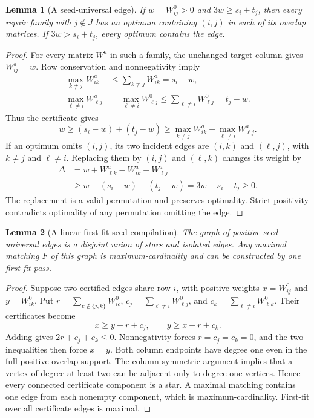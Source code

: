 \documentclass[11pt]{article}
\newtheorem{lemma}{Lemma}
\begin{document}
\begin{lemma}[A seed-universal edge]\label{lem:seed-universal-edge}
If $w=W^0_{ij}>0$ and $3w\ge s_i+t_j$, then every repair family with $j\notin J$ has an optimum containing $(i,j)$ in each of its overlap matrices. If $3w>s_i+t_j$, every optimum contains the edge.
\end{lemma}
\begin{proof}
For every matrix $W^a$ in such a family, the unchanged target column gives $W^a_{ij}=w$. Row conservation and nonnegativity imply
\begin{align}
\max_{k\ne j}W^a_{ik}&\le\sum_{k\ne j}W^a_{ik}=s_i-w,\\
\max_{\ell\ne i}W^a_{\ell j}&=\max_{\ell\ne i}W^0_{\ell j}\le\sum_{\ell\ne i}W^0_{\ell j}=t_j-w.
\end{align}
Thus the certificate gives
\begin{equation}
w\ge(s_i-w)+(t_j-w)\ge\max_{k\ne j}W^a_{ik}+\max_{\ell\ne i}W^a_{\ell j}.
\end{equation}
If an optimum omits $(i,j)$, its two incident edges are $(i,k)$ and $(\ell,j)$, with $k\ne j$ and $\ell\ne i$. Replacing them by $(i,j)$ and $(\ell,k)$ changes its weight by
\begin{align}
\Delta&=w+W^a_{\ell k}-W^a_{ik}-W^a_{\ell j}\\
&\ge w-(s_i-w)-(t_j-w)=3w-s_i-t_j\ge0.
\end{align}
The replacement is a valid permutation and preserves optimality. Strict positivity contradicts optimality of any permutation omitting the edge.
\end{proof}

\begin{lemma}[A linear first-fit seed compilation]\label{lem:seed-first-fit}
The graph of positive seed-universal edges is a disjoint union of stars and isolated edges. Any maximal matching $F$ of this graph is maximum-cardinality and can be constructed by one first-fit pass.
\end{lemma}
\begin{proof}
Suppose two certified edges share row $i$, with positive weights $x=W^0_{ij}$ and $y=W^0_{ik}$. Put $r=\sum_{c\notin\{j,k\}}W^0_{ic}$, $c_j=\sum_{\ell\ne i}W^0_{\ell j}$, and $c_k=\sum_{\ell\ne i}W^0_{\ell k}$. Their certificates become
\begin{equation}
x\ge y+r+c_j,\qquad y\ge x+r+c_k.
\end{equation}
Adding gives $2r+c_j+c_k\le0$. Nonnegativity forces $r=c_j=c_k=0$, and the two inequalities then force $x=y$. Both column endpoints have degree one even in the full positive overlap support. The column-symmetric argument implies that a vertex of degree at least two can be adjacent only to degree-one vertices. Hence every connected certificate component is a star. A maximal matching contains one edge from each nonempty component, which is maximum-cardinality. First-fit over all certificate edges is maximal.
\end{proof}
\end{document}
